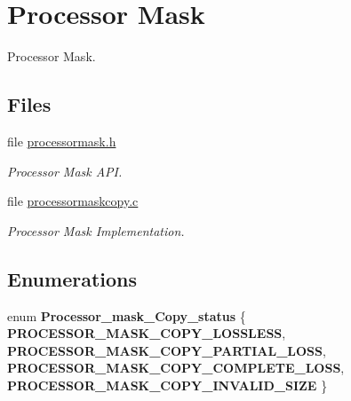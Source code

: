 \hypertarget{group__RTEMSScoreProcessorMask}{}\section{Processor Mask}
\label{group__RTEMSScoreProcessorMask}


Processor Mask.  


\subsection*{Files}
\begin{DoxyCompactItemize}
\item 
file \mbox{\hyperlink{processormask_8h}{processormask.\+h}}
\begin{DoxyCompactList}\small\item\em Processor Mask A\+PI. \end{DoxyCompactList}\item 
file \mbox{\hyperlink{processormaskcopy_8c}{processormaskcopy.\+c}}
\begin{DoxyCompactList}\small\item\em Processor Mask Implementation. \end{DoxyCompactList}\end{DoxyCompactItemize}
\subsection*{Enumerations}
\begin{DoxyCompactItemize}
\item 
\mbox{\label{group__RTEMSScoreProcessorMask_ga51ff346ba01b52d1207d2a1dec7f0086}} 
enum {\bfseries Processor\+\_\+mask\+\_\+\+Copy\+\_\+status} \{ {\bfseries P\+R\+O\+C\+E\+S\+S\+O\+R\+\_\+\+M\+A\+S\+K\+\_\+\+C\+O\+P\+Y\+\_\+\+L\+O\+S\+S\+L\+E\+SS}, 
{\bfseries P\+R\+O\+C\+E\+S\+S\+O\+R\+\_\+\+M\+A\+S\+K\+\_\+\+C\+O\+P\+Y\+\_\+\+P\+A\+R\+T\+I\+A\+L\+\_\+\+L\+O\+SS}, 
{\bfseries P\+R\+O\+C\+E\+S\+S\+O\+R\+\_\+\+M\+A\+S\+K\+\_\+\+C\+O\+P\+Y\+\_\+\+C\+O\+M\+P\+L\+E\+T\+E\+\_\+\+L\+O\+SS}, 
{\bfseries P\+R\+O\+C\+E\+S\+S\+O\+R\+\_\+\+M\+A\+S\+K\+\_\+\+C\+O\+P\+Y\+\_\+\+I\+N\+V\+A\+L\+I\+D\+\_\+\+S\+I\+ZE}
 \}
\end{DoxyCompactItemize}
